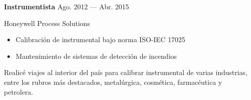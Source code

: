 \bigskip
\parbox[t][][t]{\linewidth}{
	{\parbox{\linewidth}{
		\parbox{\linewidth}{
			\textbf{Instrumentista}
			\hfill
			{Ago. 2012 --- Abr. 2015}
		}
	}}
	\smallbreak
	\parbox{\linewidth}{Honeywell Process Solutions}
	\smallbreak
	\begin{itemize}
	    \item{Calibración de instrumental bajo norma ISO-IEC 17025}
	    \item{Mantenimiento de sistemas de detección de incendios}
	\end{itemize}
	\smallbreak
	Realicé viajes al interior del país para calibrar instrumental de varias industrias, entre los rubros más destacados, metalúrgica, cosmética, farmacéutica y petrolera.\\

}

